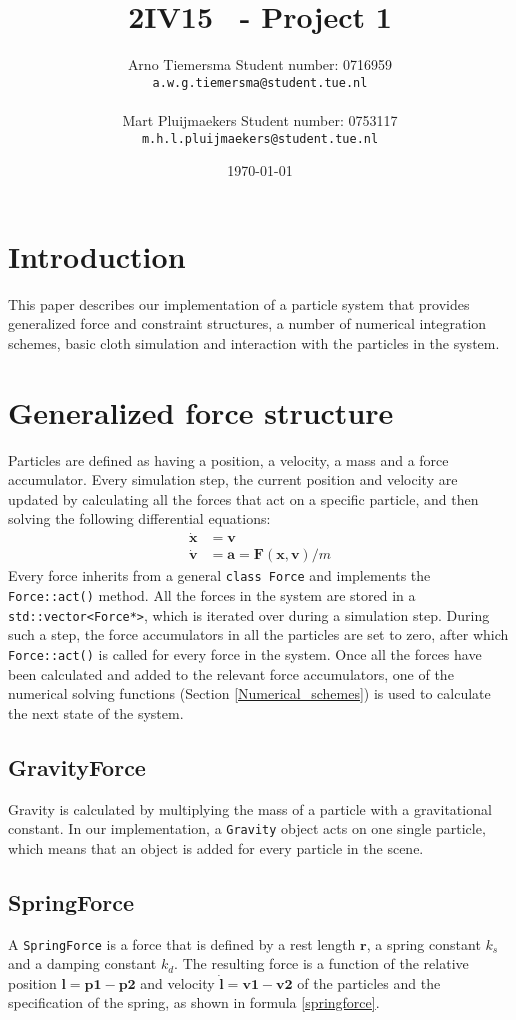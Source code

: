 \documentclass[a4paper,twoside,11pt,twocolumn]{article}
\title{\sffamily\bfseries 2IV15 \scg\ - Project 1}
\author{Arno Tiemersma \qquad Student number: 0716959 \\{\tt a.w.g.tiemersma@student.tue.nl}\\ \\Mart Pluijmaekers \qquad Student number: 0753117 \\{\tt m.h.l.pluijmaekers@student.tue.nl}}
\date{\today}
\begin{document}
\maketitle
\section{Introduction}
This paper describes our implementation of a particle system that provides generalized force and constraint structures, a number of numerical integration schemes, basic cloth simulation and interaction with the particles in the system.

\section{Generalized force structure}
Particles are defined as having a position, a velocity, a mass and a force accumulator. Every simulation step, the current position and velocity are updated by calculating all the forces that act on a specific particle, and then solving the following differential equations:
\begin{align}
	\dot{\mathbf{x}} &= \mathbf{v}\\
	\dot{\mathbf{v}} &= \mathbf{a} = \mathbf{F}(\mathbf{x},\mathbf{v})/m
\end{align}
Every force inherits from a general \texttt{class Force} and implements the \texttt{Force::act()} method. All the forces in the system are stored in a \texttt{std::vector<Force*>}, which is iterated over during a simulation step. During such a step, the force accumulators in all the particles are set to zero, after which \texttt{Force::act()} is called for every force in the system. Once all the forces have been calculated and added to the relevant force accumulators, one of the numerical solving functions (Section \ref{Numerical_schemes}) is used to calculate the next state of the system.
\subsection{GravityForce}
Gravity is calculated by multiplying the mass of a particle with a gravitational constant. In our implementation, a \texttt{Gravity} object acts on one single particle, which means that an object is added for every particle in the scene.
\subsection{SpringForce}
A \texttt{SpringForce} is a force that is defined by a rest length $\mathbf{r}$, a spring constant $k_s$ and a damping constant $k_d$. The resulting force is a function of the relative position $\mathbf{l = p1 - p2}$ and velocity $\mathbf{\dot{l} = v1 - v2}$ of the particles and the specification of the spring, as shown in formula \ref{springforce}. 
\end{document}
